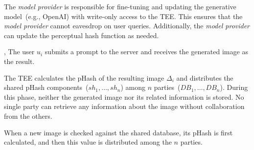 \begin{compactitem}
    \item[]  The \textit{model provider} is responsible for fine-tuning and updating the generative model~(e.g., OpenAI) with write-only access to the TEE. This ensures that the \textit{model provider} cannot eavesdrop on user queries. Additionally, the \textit{model provider} can update the perceptual hash function as needed.\\
    \item[] ,  The user $u_i$ submits a prompt to the server and receives the generated image as the result.\\
    
    \item[]  The TEE calculates the pHash of the resulting image $\Delta_i$ and distributes the shared pHash components~($sh_1,\dots, sh_n$) among $n$ parties~($DB_1,\dots,DB_n$). During this phase, neither the generated image nor its related information is stored. No single party can retrieve any information about the image without collaboration from the others.\\
    
    \item[]  When a new image is checked against the shared database, its pHash is first calculated, and then this value is distributed among the $n$ parties.\\
    

\end{compactitem}
